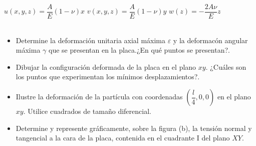 \documentclass[../notas medios.tex]{subfiles}
\begin{document}
\begin{enumerate}
$ u \left(x,y,z \right) =  \dfrac{A}{E}  \left(1 - \nu \right) x$ \hspace*{5mm}
$ v \left(x,y,z \right) = \dfrac{A}{E}  \left(1 - \nu \right) y$	\hspace*{5mm} 
$ w \left(z \right) = -\dfrac{2A \nu}{E} z$ \\\\
%
\begin{figure}[H]
	\centering
	\hspace{2 cm}
\end{figure}
%
\begin{itemize}
	\item Determine la deformaci\'on unitaria axial m\'axima $\varepsilon$ y la deformac\'on angular m\'axima {\Large{$\gamma$}} que se presentan en la placa.¿En qu\'e puntos se presentan?.
	\item Dibujar la configuraci\'on deformada de la placa en el plano $xy$. ¿Cu\'ales son los puntos que experimentan los m\'inimos desplazamientos?.
	\item Ilustre la deformaci\'on de la part\'icula con coordenadas $\left( \dfrac{l}{4}, 0, 0 \right)$ en el plano $xy$. Utilice cuadrados de tama\~no diferencial.
	\item Determine y represente gr\'aficamente, sobre la figura (b), la tensi\'on normal y tangencial a la cara de la placa, contenida en el cuadrante I del plano $XY$.
\end{itemize}



\end{enumerate}
\end{document}
